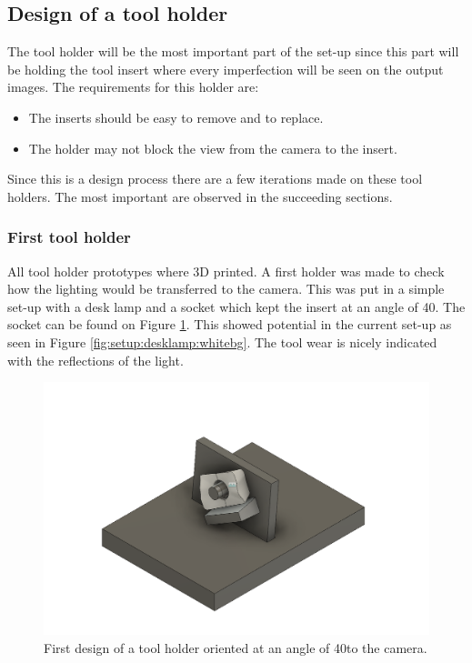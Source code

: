 	
	\subsection{Design of a tool holder}
	The tool holder will be the most important part of the set-up since this part will be holding the tool insert where every imperfection will be seen on the output images. The requirements for this holder are:
	\begin{itemize}
	\item The inserts should be easy to remove and to replace.
	\item The holder may not block the view from the camera to the insert.
\end{itemize}	
	
	Since this is a design process there are a few iterations made on these tool holders. The most important are observed in the succeeding sections.
	
	
	\subsubsection{First tool holder}
	\label{sec:impl:camerasetup:firsttoolholder}
	All tool holder prototypes where 3D printed. A first holder was made to check how the lighting would be transferred to the camera. This was put in a simple set-up with a desk lamp and a socket which kept the insert at an angle of 40\textdegree. The socket can be found on Figure \ref{fig:impl:setup:fth}. This showed potential in the current set-up as seen in Figure \ref{fig:setup:desklamp:whitebg}. The tool wear is nicely indicated with the reflections of the light. 
	
	\begin{figure}[hbtp]
	\centering
	\includegraphics[scale=0.2]{fig/Camera_setup/Tool_Holder/simpeleHouder_attaached.png}
	\caption{First design of a tool holder oriented at an angle of 40\textdegree to the camera.}
	\label{fig:impl:setup:fth}
	\end{figure}
	
